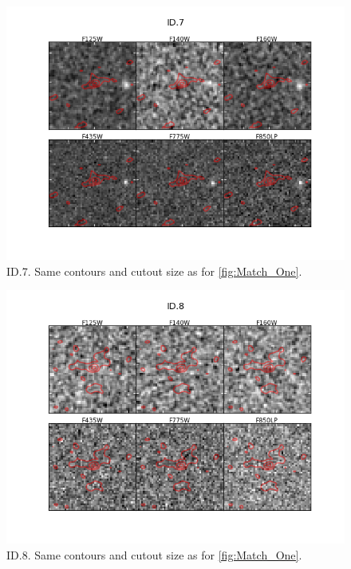 \begin{figure}[tbp]
\centering \includegraphics[width=160mm]{Matched/ASPECS_Cutout_6.png}
\caption{ID.7. Same contours and cutout size as for \ref{fig:Match_One}.}
\label{fig:Match_Three}
\end{figure}

\begin{figure}[tbp]
\centering \includegraphics[width=160mm]{Matched/ASPECS_Cutout_7.png}
\caption{ID.8. Same contours and cutout size as for \ref{fig:Match_One}.}
\label{fig:Match_Three}
\end{figure}

